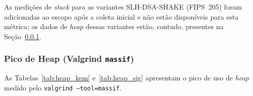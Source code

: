 As medições de \textit{stack} para as variantes SLH-DSA-SHAKE
(FIPS~205) foram adicionadas ao escopo após a coleta inicial e
não estão disponíveis para esta métrica; os dados de
\textit{heap} dessas variantes estão, contudo, presentes na
Seção~\ref{sec:res-heap}.

\subsubsection{Pico de Heap (Valgrind \texttt{massif})}
\label{sec:res-heap}

As Tabelas~\ref{tab:heap_kem} e~\ref{tab:heap_sig} apresentam o
pico de uso de \textit{heap} medido pelo
\texttt{valgrind --tool=massif}.

\begin{table}[ht]
\centering
\caption{Pico de \textit{heap} por KEM e operação (KB).
Medido com \texttt{valgrind --tool=massif}; valor de pico
de \texttt{mem\_heap\_B} para cada operação isolada.}
\label{tab:heap_kem}
\end{table}

